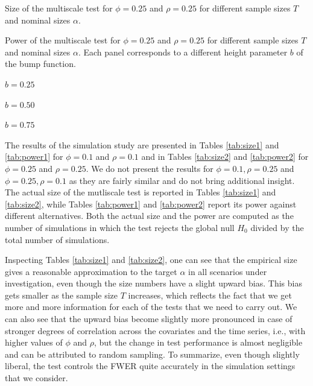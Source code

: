 \documentclass[12pt]{article}
\begin{document}
\addtocounter{table}{-1} 
\begin{table}[h!]
\footnotesize{
\begin{center}
\caption{Size of the multiscale test for $\phi = 0.25$ and $\rho = 0.25$ for different sample sizes $T$ and nominal sizes $\alpha$.}
\label{tab:size2}
\renewcommand{\arraystretch}{1.2}

\end{center}}
\footnotesize{
\begin{center}
\caption{Power of the multiscale test for $\phi = 0.25$ and $\rho = 0.25$ for different sample sizes $T$ and nominal sizes $\alpha$. Each panel corresponds to a different height parameter $b$ of the bump function.}\label{tab:power2}
\begin{subtable}[b]{0.32\textwidth}
\centering
\caption{$b = 0.25$}\label{tab:power2_025}
\renewcommand{\arraystretch}{1.2}

\end{subtable}
\begin{subtable}[b]{0.32\textwidth}
\centering
\caption{$b = 0.50$}\label{tab:power2_050}
\renewcommand{\arraystretch}{1.2}

\end{subtable}
\begin{subtable}[b]{0.32\textwidth}
\centering
\caption{$b = 0.75$}\label{tab:power2_075}
\renewcommand{\arraystretch}{1.2}

\end{subtable}
\end{center}}
\vspace{-0.4cm}
\end{table}


The results of the simulation study are presented in Tables \ref{tab:size1} and \ref{tab:power1} for $\phi = 0.1$ and $\rho = 0.1$ and in Tables \ref{tab:size2} and \ref{tab:power2} for $\phi = 0.25$ and $\rho = 0.25$. We do not present the results for $\phi = 0.1, \rho = 0.25$ and $\phi = 0.25, \rho = 0.1$ as they are fairly similar and do not bring additional insight. The actual size of the mutliscale test is reported in Tables \ref{tab:size1} and \ref{tab:size2}, while Tables \ref{tab:power1} and \ref{tab:power2} report its power against different alternatives. Both the actual size and the power are computed as the number of simulations in which the test rejects the global null $H_0$ divided by the total number of simulations.

Inspecting Tables \ref{tab:size1} and \ref{tab:size2}, one can see that the empirical size gives a reasonable approximation to the target $\alpha$ in all scenarios under investigation, even though the size numbers have a slight upward bias. This bias gets smaller as the sample size $T$ increases, which reflects the fact that we get more and more information for each of the tests that we need to carry out. We can also see that the upward bias become slightly more pronounced in case of stronger degrees of correlation across the covariates and the time series, i.e., with higher values of $\phi$ and $\rho$, but the change in test performance is almost negligible and can be attributed to random sampling. To summarize, even though slightly liberal, the test controls the FWER quite accurately in the simulation settings that we consider.
 
\end{document}
